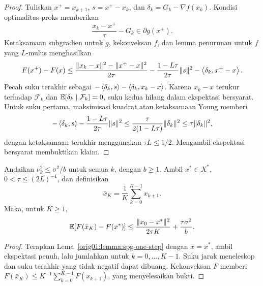 \begin{proof}
  Tuliskan $x^+=x_{k+1}$,
  $s=x^+-x_k$, dan $\delta_k=G_k-\nabla f(x_k)$. Kondisi optimalitas
  proks memberikan
  \begin{equation}
    \frac{x_k-x^+}{\tau}-G_k\in\partial g(x^+).
  \end{equation}
  Ketaksamaan subgradien untuk $g$, kekonveksan $f$, dan lemma penurunan untuk
  $f$ yang $L$-mulus menghasilkan
  \begin{multline}
    F(x^+)-F(x)
    \leq
    \frac{\|x_k-x\|^2-\|x^+-x\|^2}{2\tau}
    -\frac{1-L\tau}{2\tau}\|s\|^2
    -\left\langle\delta_k , x^+-x\right\rangle.
    \label{orig01:eq:spg-pathwise}
  \end{multline}
  Pecah suku terakhir sebagai
  $-\left\langle\delta_k , s\right\rangle-\left\langle\delta_k , x_k-x\right\rangle$. Karena
  $x_k-x$ terukur terhadap $\mathcal F_k$ dan
  $\mathbb{E}[\delta_k\mid\mathcal F_k]=0$, suku kedua hilang dalam ekspektasi
  bersyarat. Untuk suku pertama, maksimisasi kuadrat atau ketaksamaan Young
  memberi
  \begin{equation}
    -\left\langle\delta_k , s\right\rangle
    -\frac{1-L\tau}{2\tau}\|s\|^2
    \leq\frac{\tau}{2(1-L\tau)}\|\delta_k\|^2
    \leq\tau\|\delta_k\|^2,
  \end{equation}
  dengan ketaksamaan terakhir menggunakan $\tau L\leq1/2$. Mengambil
  ekspektasi bersyarat membuktikan klaim.
\end{proof}

\begin{theorem}
  \label{orig01:theorem:spg-ergodic}
  Andaikan $\nu_k^2\leq\sigma^2/b$ untuk semua $k$, dengan $b\geq1$.
  Ambil $x^*\in X^*$, $0<\tau\leq(2L)^{-1}$, dan definisikan
  \begin{equation}
    \bar x_K=\frac1K\sum_{k=0}^{K-1}x_{k+1}.
  \end{equation}
  Maka, untuk $K\geq1$,
  \begin{equation}
    \label{orig01:eq:spg-ergodic-rate}
    \mathbb{E}[F(\bar x_K)-F(x^*)]
    \leq
    \frac{\|x_0-x^*\|^2}{2\tau K}
    +\frac{\tau\sigma^2}{b}.
  \end{equation}
\end{theorem}

\begin{proof}
  Terapkan Lema~\ref{orig01:lemma:spg-one-step} dengan $x=x^*$, ambil
  ekspektasi penuh, lalu jumlahkan untuk $k=0,\dots,K-1$. Suku jarak
  meneleskop dan suku terakhir yang tidak negatif dapat dibuang. Kekonveksan
  $F$ memberi
  $F(\bar x_K)\leq K^{-1}\sum_{k=0}^{K-1}F(x_{k+1})$, yang menyelesaikan
  bukti.
\end{proof}

